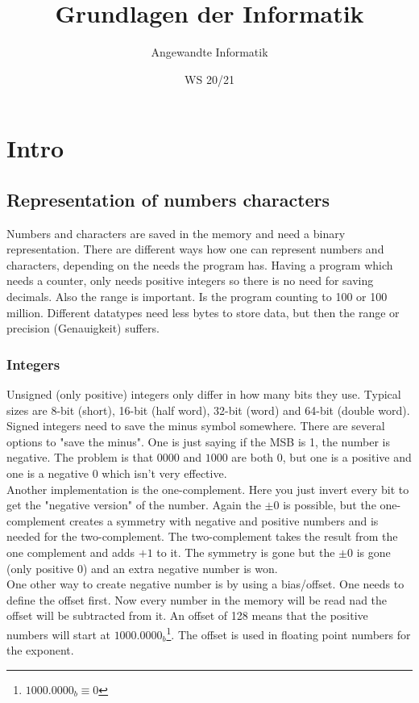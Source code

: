 \documentclass[a4paper]{scrartcl}
\author{Angewandte Informatik}
\title{Grundlagen der Informatik}
\date{WS 20/21}
\begin{document}
    \maketitle
    \newpage
    \tableofcontents
    \newpage
    \section{Intro}
        \subsection{Representation of numbers characters}
        Numbers and characters are saved in the memory and need a binary representation. There are different ways how one can represent numbers and characters,
        depending on the needs the program has. Having a program which needs a counter, only needs positive integers so there is no need for saving decimals.  Also the 
        range is important. Is the program counting to 100 or 100 million. Different datatypes need less bytes to store data, but then the range or precision (Genauigkeit) suffers.
        
        \subsubsection*{Integers}
        Unsigned (only positive) integers only differ in how many bits they use. Typical sizes are  8-bit (short), 16-bit (half word), 32-bit (word) and 64-bit (double word). \\
        Signed integers need to save the minus symbol somewhere. There are several options to "save the minus". One is just saying if the MSB is 1, the number is negative. The problem
        is that \(0000\) and \(1000\) are both \(0\), but one is a positive and one is a negative \(0\) which isn't very effective. \\
        Another implementation is the one-complement.
        Here you just invert every bit to get the "negative version" of the number. Again the \(\pm 0\) is possible, but the one-complement 
        creates a symmetry with negative and positive numbers and is needed for the two-complement. 
        The two-complement takes the result from the one complement and adds \(+1\) to it. The symmetry is gone but the \(\pm 0\) is gone (only positive 0) and an extra negative number is won. \\
        One other way to create negative number is by using a bias/offset. One needs to define the offset first. Now every number in the memory will be read nad the offset will be 
        subtracted from it. An offset of 128 means that the positive numbers will start at \(1000.0000_b \)\footnote{\(1000.0000_b \equiv 0\)}. The offset is used in floating point numbers for the exponent.
\end{document}
